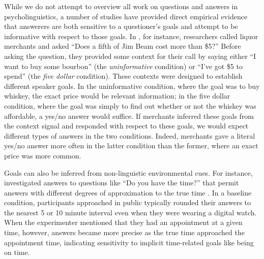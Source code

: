 \documentclass[11pt, floatsintext]{apa6}
\begin{document}
While we do not attempt to overview all work on questions and answers in psycholinguistics, a number of studies have provided direct empirical evidence that answerers are both sensitive to a questioner's goals and attempt to be informative with respect to those goals.
In , for instance, researchers called liquor merchants and asked ``Does a fifth of Jim Beam cost more than \$5?'' 
Before asking the question, they provided some context for their call by saying either ``I want to buy some bourbon'' (the \emph{uninformative} condition) or ``I've got \$5 to spend'' (the \emph{five dollar} condition). 
These contexts were designed to establish different speaker goals. 
In the uninformative condition, where the goal was to buy whiskey, the exact price would be relevant information; 
in the five dollar condition, where the goal was simply to find out whether or not the whiskey was affordable, a yes/no answer would suffice. 
If merchants inferred these goals from the context signal and responded with respect to these goals, we would expect different types of answers in the two conditions. 
Indeed, merchants gave a literal yes/no answer more often in the latter condition than the former, where an exact price was more common. 

Goals can also be inferred from non-linguistic environmental cues. 
For instance,  investigated answers to questions like ``Do you have the time?'' that permit answers with different degrees of approximation to the true time \cite<see also>{GibbsBryant08_OptimalRelevance}. 
In a baseline condition, participants approached in public typically rounded their answers to the nearest 5 or 10 minute interval even when they were wearing a digital watch. 
When the experimenter mentioned that they had an appointment at a given time, however, answers became more precise as the true time approached the appointment time, indicating sensitivity to implicit time-related goals like being on time.  
\end{document}
